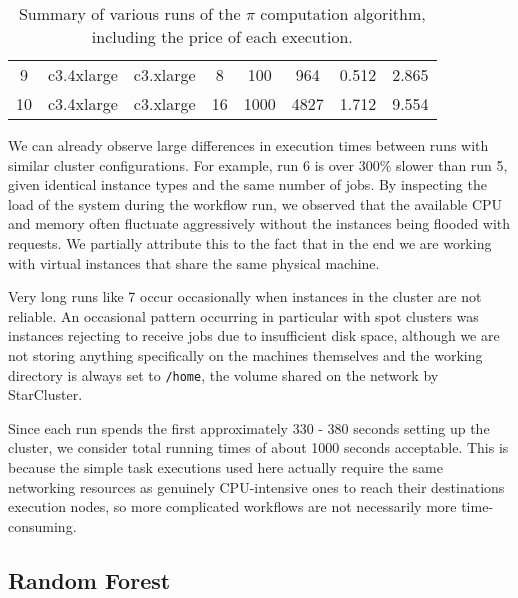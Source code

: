\begin{table}[h]
\begin{adjustbox}{width=1\textwidth}
\begin{tabular}{cccccccc}
\multicolumn{1}{c|}{9} & \multicolumn{1}{c|}{c3.4xlarge} & \multicolumn{1}{c|}{c3.xlarge} & \multicolumn{1}{c|}{8} & \multicolumn{1}{c|}{100} & \multicolumn{1}{c|}{964} & \multicolumn{1}{c|}{0.512} & \multicolumn{1}{c|}{2.865} \\ \cline{2-8} 
\multicolumn{1}{c|}{10} & \multicolumn{1}{c|}{c3.4xlarge} & \multicolumn{1}{c|}{c3.xlarge} & \multicolumn{1}{c|}{16} & \multicolumn{1}{c|}{1000} & \multicolumn{1}{c|}{4827} & \multicolumn{1}{c|}{1.712} & \multicolumn{1}{c|}{9.554} \\ \cline{2-8} 
\end{tabular}
\end{adjustbox}
\caption{Summary of various runs of the $\pi$ computation algorithm, including the price of each execution.}
\label{PiTable}
\end{table}

We can already observe large differences in execution times between runs with similar cluster configurations. For example, run 6 is over 300\% slower than run 5, given identical instance types and the same number of jobs. By inspecting the load of the system during the workflow run, we observed that the available CPU and memory often fluctuate aggressively without the instances being flooded with requests. We partially attribute this to the fact that in the end we are working with virtual instances that share the same physical machine.

Very long runs like 7 occur occasionally when instances in the cluster are not reliable. An occasional pattern occurring in particular with spot clusters was instances rejecting to receive jobs due to insufficient disk space, although we are not storing anything specifically on the machines themselves and the working directory is always set to \verb|/home|, the volume shared on the network by StarCluster.

Since each run spends the first approximately 330 - 380 seconds setting up the cluster, we consider total running times of about 1000 seconds acceptable. This is because the simple task executions used here actually require the same networking resources as genuinely CPU-intensive ones to reach their destinations execution nodes, so more complicated workflows are not necessarily more time-consuming.

\subsection{Random Forest}

